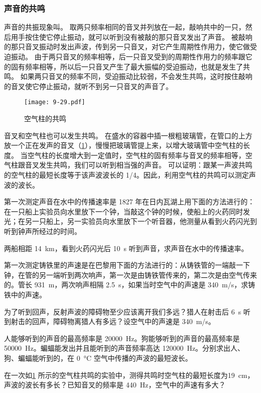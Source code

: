 \subsubsection{声音的共鸣}
声音的共振现象叫。
取两只频率相同的音叉并列放在一起，敲响共中的一只，然后用手按住使它停止振动，就可以听到没有被敲的那只音叉发出了声音。
被敲响的那只音叉振动时发出声波，传到另一只音叉，对它产生周期性作用力，使它做受迫振动。
由于两只音叉的频率相等，后一只音叉受到的周期性作用力的频率跟它的固有频率相等，所以后一只音叉产生了最大振幅的受迫振动，也就是发生了共鸣。
如果两只音叉的频率不同，受迫振动比较弱，不会发生共鸣，这时按住敲响的音叉使它停止振动，就听不到另一只音叉的声音了。
\begin{figure}
  \texttt{[image: 9-29.pdf]}
  \caption{空气柱的共鸣}\label{fig:9-29}
\end{figure}

音叉和空气柱也可以发生共鸣。
在盛水的容器中插一根粗玻璃管，在管口的上方放一个正在发声的音叉（\cref{fig:9-29}），慢慢把玻璃管提上来，以增大玻璃管中空气柱的长度。
当空气柱的长度增大到一定值时，空气柱的固有频率与音叉的频率相等，空气柱跟音叉发生共鸣，我们可以听到相当强的声音。
可以证明：跟某一声波共鸣的空气柱的最短长度等于该声波波长的 1/4。因此，利用空气柱的共鸣可以测定声波的波长。

\begin{Practice}
\begin{question}
  \item 第一次测定声音在水中的传播速率是 1827 年在日内瓦湖上用下面的方法进行的：在一只船上实验员向水里放下一个钟，当敲这个钟的时候，使船上的火药同时发光；在另一只船上，另一实验员向水里放下一个听音器，他测量从看到火药闪光到听到钟声所经过的时间。

  两船相距 \qty{14}{km}，看到火药闪光后 \qty{10}{s} 听到声音，求声音在水中的传播速率。

  \item 第一次测定铸铁里的声速是在巴黎用下面的方法进行的：从铸铁管的一端敲一下钟，在管的另一端听到两次响声，第一次是由铸铁管传来的，第二次是由空气传来的。管长 \qty{931}{m}，两次响声相隔 \qty{2.5}{s}，如果当时空气中的声速是 \qty{340}{m/s}，求铸铁中的声速。

  \item 为了听到回声，反射声波的障碍物至少应该离开我们多远？猎人在射击后 \qty{6}{s} 听到射击的回声，障碍物离猎人有多远？设空气中的声速是 \qty{340}{m/s}。
  \item 人能够听到的声音的最高频率是 \qty{20000}{Hz}。狗能够听到的声音的最高频率是 \qty{50000}{Hz}。蝙蝠能发出并且能听到的声音频率高达 \qty{120000}{Hz}。分别求出人、狗、蝙蝠能听到的，在 \qty{0}{\celsius} 空气中传播的声波的最短波长。
  \item 在一次如\cref{fig:9-29} 所示的空气柱共鸣的实验中，测得共鸣时空气柱的最短长度为\qty{19}{cm}，声波的波长有多长？已知音叉的频率是 \qty{440}{Hz}，空气中的声速有多大？
\end{question}
\end{Practice}

